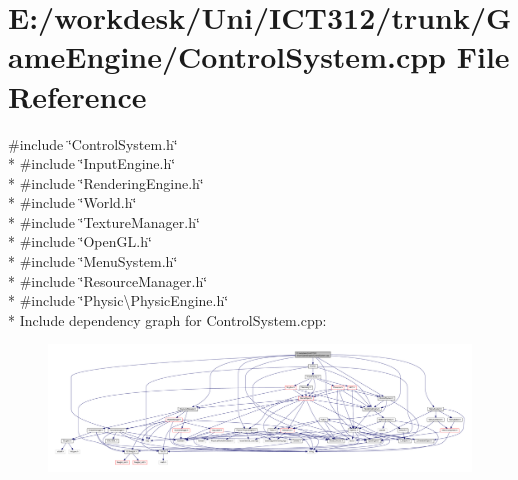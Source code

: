 \section{E\+:/workdesk/\+Uni/\+I\+C\+T312/trunk/\+Game\+Engine/\+Control\+System.cpp File Reference}
\label{_control_system_8cpp}
{\ttfamily \#include \char`\"{}Control\+System.\+h\char`\"{}}\\*
{\ttfamily \#include \char`\"{}Input\+Engine.\+h\char`\"{}}\\*
{\ttfamily \#include \char`\"{}Rendering\+Engine.\+h\char`\"{}}\\*
{\ttfamily \#include \char`\"{}World.\+h\char`\"{}}\\*
{\ttfamily \#include \char`\"{}Texture\+Manager.\+h\char`\"{}}\\*
{\ttfamily \#include \char`\"{}Open\+G\+L.\+h\char`\"{}}\\*
{\ttfamily \#include \char`\"{}Menu\+System.\+h\char`\"{}}\\*
{\ttfamily \#include \char`\"{}Resource\+Manager.\+h\char`\"{}}\\*
{\ttfamily \#include \char`\"{}Physic\textbackslash{}\+Physic\+Engine.\+h\char`\"{}}\\*
Include dependency graph for Control\+System.\+cpp\+:\nopagebreak
\begin{figure}[H]
\begin{center}
\leavevmode
\includegraphics[width=350pt]{da/d97/_control_system_8cpp__incl}
\end{center}
\end{figure}
